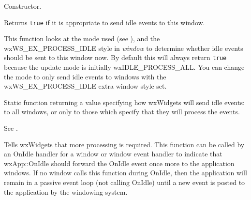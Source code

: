 
\label{wxidleeventctor}


Constructor.

\label{wxidleeventcansend}


Returns {\tt true} if it is appropriate to send idle events to
this window.

This function looks at the mode used (see ),
and the wxWS\_EX\_PROCESS\_IDLE style in {\it window} to determine whether idle events should be sent to
this window now. By default this will always return {\tt true} because
the update mode is initially wxIDLE\_PROCESS\_ALL. You can change the mode
to only send idle events to windows with the wxWS\_EX\_PROCESS\_IDLE extra window style set.



\label{wxidleeventgetmode}


Static function returning a value specifying how wxWidgets
will send idle events: to all windows, or only to those which specify that they
will process the events.

See .

\label{wxidleeventrequestmore}


Tells wxWidgets that more processing is required. This function can be called by an OnIdle
handler for a window or window event handler to indicate that wxApp::OnIdle should
forward the OnIdle event once more to the application windows. If no window calls this function
during OnIdle, then the application will remain in a passive event loop (not calling OnIdle) until a
new event is posted to the application by the windowing system.



